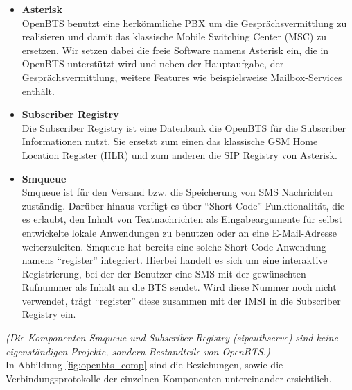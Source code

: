 \begin{itemize}
\item \textbf{Asterisk}\\
OpenBTS benutzt eine herkömmliche PBX um die Gesprächsvermittlung zu realisieren und damit das klassische Mobile Switching Center (MSC) zu ersetzen. Wir setzen dabei die freie Software namens Asterisk ein, die in OpenBTS unterstützt wird und neben der Hauptaufgabe, der Gesprächsvermittlung, weitere Features wie beispielsweise Mailbox-Services enthält. 
\end{itemize}
\begin{itemize}
\item \textbf{Subscriber Registry}\\
Die Subscriber Registry ist eine Datenbank die OpenBTS für die Sub\-scriber Informationen nutzt. Sie ersetzt zum einen das klassische GSM Home Location Register (HLR) und zum anderen die SIP Registry von Asterisk.
\end{itemize}
\begin{itemize}
\item \textbf{Smqueue}\\
Smqueue ist für den Versand bzw. die Speicherung von SMS Nachrichten zuständig. Darüber hinaus verfügt es über "`Short Code"'-Funktionalität, die es erlaubt, den Inhalt von Textnachrichten als Eingabeargumente für selbst entwickelte lokale Anwendungen zu benutzen oder an eine E-Mail-Adresse weiterzuleiten.
Smqueue hat bereits eine solche Short-Code-Anwendung namens "`register"' integriert. Hierbei handelt es sich um eine interaktive Registrierung, bei der der Benutzer eine SMS mit der gewünschten Rufnummer als Inhalt an die BTS sendet. Wird diese Nummer noch nicht verwendet, trägt "`register"' diese zusammen mit der IMSI in die Subscriber Registry ein. %
\end{itemize}

\textit{(Die Komponenten Smqueue und Subscriber Registry (sipauthserve) sind keine eigenständigen Projekte, sondern Bestandteile von OpenBTS.)}\\
\newpage
In Abbildung \ref{fig:openbts_comp} sind die Beziehungen, sowie die Verbindungsprotokolle der einzelnen Komponenten untereinander ersichtlich.

